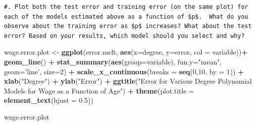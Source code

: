 \documentclass[]{article}
\newenvironment{Shaded}{\begin{snugshade}}{\end{snugshade}}
\newcommand{\KeywordTok}[1]{\textcolor[rgb]{0.13,0.29,0.53}{\textbf{#1}}}
\newcommand{\DataTypeTok}[1]{\textcolor[rgb]{0.13,0.29,0.53}{#1}}
\newcommand{\DecValTok}[1]{\textcolor[rgb]{0.00,0.00,0.81}{#1}}
\newcommand{\FloatTok}[1]{\textcolor[rgb]{0.00,0.00,0.81}{#1}}
\newcommand{\StringTok}[1]{\textcolor[rgb]{0.31,0.60,0.02}{#1}}
\newcommand{\OperatorTok}[1]{\textcolor[rgb]{0.81,0.36,0.00}{\textbf{#1}}}
\newcommand{\NormalTok}[1]{#1}
\begin{document}
\begin{verbatim}
#. Plot both the test error and training error (on the same plot) for each of the models estimated above as a function of $p$.  What do you observe about the training error as $p$ increases? What about the test error? Based on your results, which model should you select and why?
\end{verbatim}

\begin{Shaded}
\begin{Highlighting}[]
\NormalTok{wage.error.plot <-}\StringTok{ }\KeywordTok{ggplot}\NormalTok{(error.melt, }\KeywordTok{aes}\NormalTok{(}\DataTypeTok{x=}\NormalTok{degree, }\DataTypeTok{y=}\NormalTok{error, }\DataTypeTok{col =}\NormalTok{ variable))}\OperatorTok{+}\StringTok{ }
\StringTok{    }\KeywordTok{geom_line}\NormalTok{() }\OperatorTok{+}
\StringTok{    }\KeywordTok{stat_summary}\NormalTok{(}\KeywordTok{aes}\NormalTok{(}\DataTypeTok{group=}\NormalTok{variable), }\DataTypeTok{fun.y=}\StringTok{"mean"}\NormalTok{, }\DataTypeTok{geom=}\StringTok{'line'}\NormalTok{, }\DataTypeTok{size=}\DecValTok{2}\NormalTok{) }\OperatorTok{+}
\StringTok{    }\KeywordTok{scale_x_continuous}\NormalTok{(}\DataTypeTok{breaks =} \KeywordTok{seq}\NormalTok{(}\DecValTok{0}\NormalTok{,}\DecValTok{10}\NormalTok{, }\DataTypeTok{by =} \DecValTok{1}\NormalTok{)) }\OperatorTok{+}
\StringTok{    }\KeywordTok{xlab}\NormalTok{(}\StringTok{"Degree"}\NormalTok{) }\OperatorTok{+}\StringTok{ }\KeywordTok{ylab}\NormalTok{(}\StringTok{"Error"}\NormalTok{) }\OperatorTok{+}\StringTok{ }
\StringTok{    }\KeywordTok{ggtitle}\NormalTok{(}\StringTok{"Error for Various Degree Polynomial Models for Wage as a Function of Age"}\NormalTok{) }\OperatorTok{+}\StringTok{ }
\StringTok{    }\KeywordTok{theme}\NormalTok{(}\DataTypeTok{plot.title =} \KeywordTok{element_text}\NormalTok{(}\DataTypeTok{hjust =} \FloatTok{0.5}\NormalTok{))}
    

\NormalTok{wage.error.plot}
\end{Highlighting}
\end{Shaded}
\end{document}
